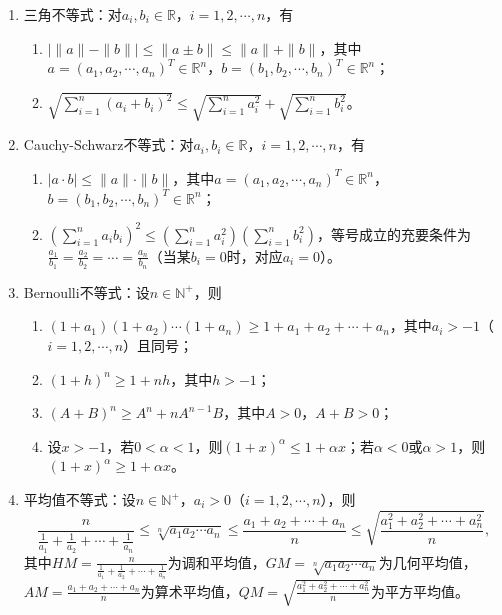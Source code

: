 \documentclass[UTF8]{ctexart}
\theoremstyle{remark}
\begin{document}
	\begin{enumerate}
		\item 三角不等式：对\(a_i, b_i \in \mathbb{R}\)，\(i = 1, 2, \cdots, n\)，有
		\begin{enumerate}
			\item \(|\|a\| - \|b\|| \leqslant \|a \pm b\| \leqslant \|a\| + \|b\|\)，其中\(a = (a_1, a_2, \cdots, a_n)^T \in \mathbb{R}^n\)，\(b = (b_1, b_2, \cdots, b_n)^T \in \mathbb{R}^n\)；
			\item \(\sqrt{\sum_{i=1}^{n}(a_i + b_i)^2} \leqslant \sqrt{\sum_{i=1}^{n}a_i^2} + \sqrt{\sum_{i=1}^{n}b_i^2}\)。
		\end{enumerate}
		
		\item Cauchy-Schwarz不等式：对\(a_i, b_i \in \mathbb{R}\)，\(i = 1, 2, \cdots, n\)，有
		\begin{enumerate}
			\item \(|a \cdot b| \leqslant \|a\| \cdot \|b\|\)，其中\(a = (a_1, a_2, \cdots, a_n)^T \in \mathbb{R}^n\)，\(b = (b_1, b_2, \cdots, b_n)^T \in \mathbb{R}^n\)；
			\item \((\sum_{i=1}^{n}a_i b_i)^2 \leqslant (\sum_{i=1}^{n}a_i^2)(\sum_{i=1}^{n}b_i^2)\)，等号成立的充要条件为\(\frac{a_1}{b_1} = \frac{a_2}{b_2} = \cdots = \frac{a_n}{b_n}\)（当某\(b_i = 0\)时，对应\(a_i = 0\)）。
		\end{enumerate}
		
		\item Bernoulli不等式：设\(n \in \mathbb{N}^+\)，则
		\begin{enumerate}
			\item \((1+a_1)(1+a_2)\cdots(1+a_n) \geqslant 1 + a_1 + a_2 + \cdots + a_n\)，其中\(a_i > -1\)（\(i = 1, 2, \cdots, n\)）且同号；
			\item \((1+h)^n \geqslant 1 + nh\)，其中\(h > -1\)；
			\item \((A+B)^n \geqslant A^n + nA^{n-1}B\)，其中\(A > 0\)，\(A + B > 0\)；
			\item 设\(x > -1\)，若\(0 < \alpha < 1\)，则\((1+x)^\alpha \leqslant 1 + \alpha x\)；若\(\alpha < 0\)或\(\alpha > 1\)，则\((1+x)^\alpha \geqslant 1 + \alpha x\)。
		\end{enumerate}
		
		\item 平均值不等式：设\(n \in \mathbb{N}^+\)，\(a_i > 0\)（\(i = 1, 2, \cdots, n\)），则
		\[
		\frac{n}{\frac{1}{a_1} + \frac{1}{a_2} + \cdots + \frac{1}{a_n}} \leqslant \sqrt[n]{a_1a_2\cdots a_n} \leqslant \frac{a_1 + a_2 + \cdots + a_n}{n} \leqslant \sqrt{\frac{a_1^2 + a_2^2 + \cdots + a_n^2}{n}},
		\]
		其中\(HM = \frac{n}{\frac{1}{a_1} + \frac{1}{a_2} + \cdots + \frac{1}{a_n}}\)为调和平均值，\(GM = \sqrt[n]{a_1a_2\cdots a_n}\)为几何平均值，\(AM = \frac{a_1 + a_2 + \cdots + a_n}{n}\)为算术平均值，\(QM = \sqrt{\frac{a_1^2 + a_2^2 + \cdots + a_n^2}{n}}\)为平方平均值。
	

\end{enumerate}
\end{document}
